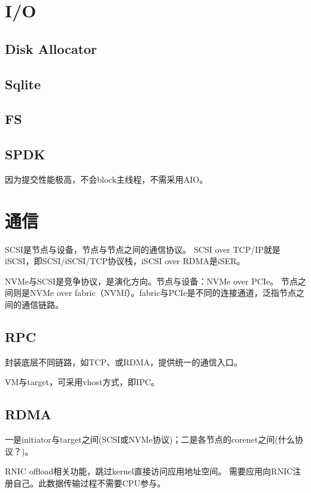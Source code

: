 \section{I/O}

\subsection{Disk Allocator}

\subsection{Sqlite}

\subsection{FS}

\subsection{SPDK}

因为提交性能极高，不会block主线程，不需采用AIO。

\section{通信}

SCSI是节点与设备，节点与节点之间的通信协议。
SCSI over TCP/IP就是iSCSI，即SCSI/iSCSI/TCP协议栈，iSCSI over RDMA是iSER。

NVMe与SCSI是竞争协议，是演化方向。节点与设备：NVMe over PCIe。
节点之间则是NVMe over fabric（NVMf）。fabric与PCIe是不同的连接通道，泛指节点之间的通信链路。

\subsection{RPC}

封装底层不同链路，如TCP、或RDMA，提供统一的通信入口。

VM与target，可采用vhost方式，即IPC。

\subsection{RDMA}

一是initiator与target之间(SCSI或NVMe协议)；二是各节点的corenet之间(什么协议？)。

RNIC offload相关功能，跳过kernel直接访问应用地址空间。
需要应用向RNIC注册自己。此数据传输过程不需要CPU参与。
